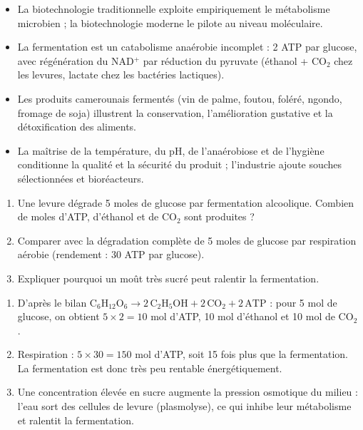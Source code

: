 \documentclass[11pt]{article}
\begin{document}
\begin{aretenir}
\begin{itemize}
\item La biotechnologie traditionnelle exploite empiriquement le métabolisme microbien ; la biotechnologie moderne le pilote au niveau moléculaire.
\item La fermentation est un catabolisme anaérobie incomplet : 2 ATP par glucose, avec régénération du NAD$^+$ par réduction du pyruvate (éthanol + CO$_2$ chez les levures, lactate chez les bactéries lactiques).
\item Les produits camerounais fermentés (vin de palme, foutou, foléré, ngondo, fromage de soja) illustrent la conservation, l'amélioration gustative et la détoxification des aliments.
\item La maîtrise de la température, du pH, de l'anaérobiose et de l'hygiène conditionne la qualité et la sécurité du produit ; l'industrie ajoute souches sélectionnées et bioréacteurs.
\end{itemize}
\end{aretenir}

\begin{exercice}
\begin{enumerate}
\item Une levure dégrade 5 moles de glucose par fermentation alcoolique. Combien de moles d'ATP, d'éthanol et de CO$_2$ sont produites ?
\item Comparer avec la dégradation complète de 5 moles de glucose par respiration aérobie (rendement : 30 ATP par glucose).
\item Expliquer pourquoi un moût très sucré peut ralentir la fermentation.
\end{enumerate}
\end{exercice}

\begin{corrige}[Exercice 1]
\begin{enumerate}
\item D'après le bilan $\text{C}_6\text{H}_{12}\text{O}_6 \rightarrow 2\,\text{C}_2\text{H}_5\text{OH} + 2\,\text{CO}_2 + 2\,\text{ATP}$ : pour 5 mol de glucose, on obtient $5 \times 2 = 10$ mol d'ATP, 10 mol d'éthanol et 10 mol de CO$_2$.
\item Respiration : $5 \times 30 = 150$ mol d'ATP, soit 15 fois plus que la fermentation. La fermentation est donc très peu rentable énergétiquement.
\item Une concentration élevée en sucre augmente la pression osmotique du milieu : l'eau sort des cellules de levure (plasmolyse), ce qui inhibe leur métabolisme et ralentit la fermentation.
\end{enumerate}
\end{corrige}
\end{document}
